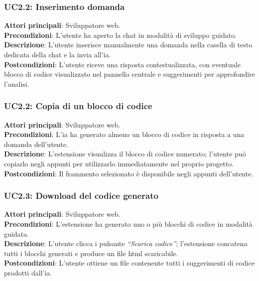 \subsubsection*{UC2.2: Inserimento domanda}
\noindent \textbf{Attori principali}: Sviluppatore web.\\
\textbf{Precondizioni}: L’utente ha aperto la chat in modalità di sviluppo guidato.\\
\textbf{Descrizione}: L’utente inserisce manualmente una domanda nella casella di testo dedicata della chat e la invia all'\acrshort{ia}.\\
\textbf{Postcondizioni}: L’utente riceve una risposta contestualizzata, con eventuale blocco di codice visualizzato nel pannello centrale e suggerimenti per approfondire l’analisi.\\

\subsubsection*{UC2.2: Copia di un blocco di codice}
\noindent \textbf{Attori principali}: Sviluppatore web.\\
\textbf{Precondizioni}: L’\acrshort{ia} ha generato almeno un blocco di codice in risposta a una domanda dell’utente.\\
\textbf{Descrizione}: L’estensione visualizza il blocco di codice numerato; l’utente può copiarlo negli appunti per utilizzarlo immediatamente nel proprio progetto.\\
\textbf{Postcondizioni}: Il frammento selezionato è disponibile negli appunti dell’utente.\\

\subsubsection*{UC2.3: Download del codice generato}
\noindent \textbf{Attori principali}: Sviluppatore web.\\
\textbf{Precondizioni}: L’estensione ha generato uno o più blocchi di codice in modalità guidata.\\
\textbf{Descrizione}: L’utente clicca i pulsante \textit{“Scarica codice”}; l’estensione concatena tutti i blocchi generati e produce un file \acrshort{html} scaricabile.\\
\textbf{Postcondizioni}: L’utente ottiene un file contenente tutti i suggerimenti di codice prodotti dall’\acrshort{ia}.\\

